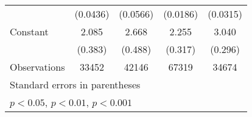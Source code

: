 {\begin{tabular*}{\textwidth}{@{\hskip\tabcolsep\extracolsep\fill}l*{4}{c}}
                    &    (0.0436)         &    (0.0566)         &    (0.0186)         &    (0.0315)         \\
\addlinespace
Constant            &       2.085\sym{***}&       2.668\sym{***}&       2.255\sym{***}&       3.040\sym{***}\\
                    &     (0.383)         &     (0.488)         &     (0.317)         &     (0.296)         \\
\midrule
Observations        &       33452         &       42146         &       67319         &       34674         \\
\bottomrule
\multicolumn{5}{l}{\footnotesize Standard errors in parentheses}\\
\multicolumn{5}{l}{\footnotesize \sym{*} \(p<0.05\), \sym{**} \(p<0.01\), \sym{***} \(p<0.001\)}\\
\end{tabular*}
}
